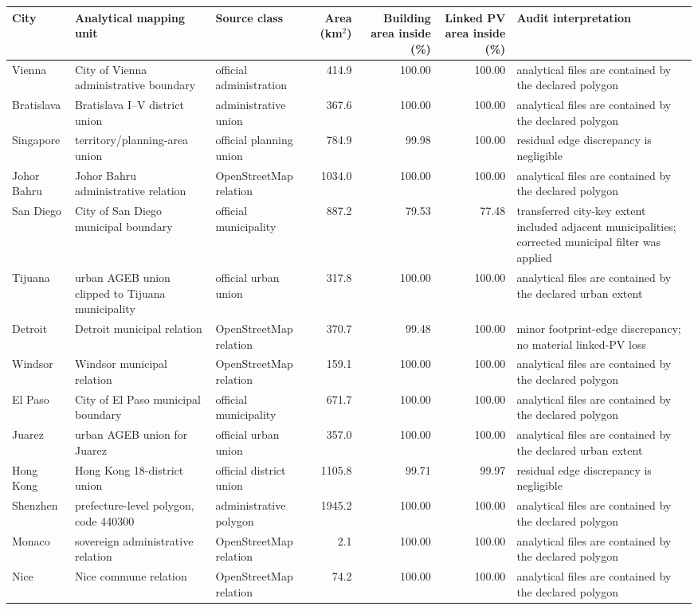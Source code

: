 \begin{tabular}{@{}>{\raggedright\arraybackslash}p{1.25cm}>{\raggedright\arraybackslash}p{3.1cm}>{\raggedright\arraybackslash}p{2.05cm}r r r >{\raggedright\arraybackslash}p{3.15cm}@{}}
\toprule
City & Analytical mapping unit & Source class & Area (km$^2$) & Building area inside (\%) & Linked PV area inside (\%) & Audit interpretation \\
\midrule
Vienna & City of Vienna administrative boundary & official administration & 414.9 & 100.00 & 100.00 & analytical files are contained by the declared polygon \\
Bratislava & Bratislava I--V district union & administrative union & 367.6 & 100.00 & 100.00 & analytical files are contained by the declared polygon \\
Singapore & territory/planning-area union & official planning union & 784.9 & 99.98 & 100.00 & residual edge discrepancy is negligible \\
Johor Bahru & Johor Bahru administrative relation & OpenStreetMap relation & 1034.0 & 100.00 & 100.00 & analytical files are contained by the declared polygon \\
San Diego & City of San Diego municipal boundary & official municipality & 887.2 & 79.53 & 77.48 & transferred city-key extent included adjacent municipalities; corrected municipal filter was applied \\
Tijuana & urban AGEB union clipped to Tijuana municipality & official urban union & 317.8 & 100.00 & 100.00 & analytical files are contained by the declared urban extent \\
Detroit & Detroit municipal relation & OpenStreetMap relation & 370.7 & 99.48 & 100.00 & minor footprint-edge discrepancy; no material linked-PV loss \\
Windsor & Windsor municipal relation & OpenStreetMap relation & 159.1 & 100.00 & 100.00 & analytical files are contained by the declared polygon \\
El Paso & City of El Paso municipal boundary & official municipality & 671.7 & 100.00 & 100.00 & analytical files are contained by the declared polygon \\
Juarez & urban AGEB union for Juarez & official urban union & 357.0 & 100.00 & 100.00 & analytical files are contained by the declared urban extent \\
Hong Kong & Hong Kong 18-district union & official district union & 1105.8 & 99.71 & 99.97 & residual edge discrepancy is negligible \\
Shenzhen & prefecture-level polygon, code 440300 & administrative polygon & 1945.2 & 100.00 & 100.00 & analytical files are contained by the declared polygon \\
Monaco & sovereign administrative relation & OpenStreetMap relation & 2.1 & 100.00 & 100.00 & analytical files are contained by the declared polygon \\
Nice & Nice commune relation & OpenStreetMap relation & 74.2 & 100.00 & 100.00 & analytical files are contained by the declared polygon \\
\bottomrule
\end{tabular}
